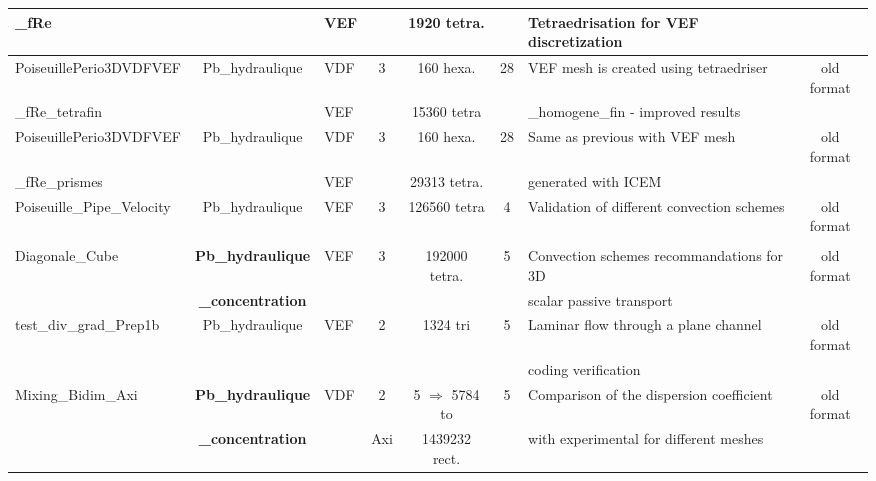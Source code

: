 \begin{table}[H]
\begin{centering}
\begin{tabular}{lclccclc}
\rowcolor{LimeGreen!10}\_fRe & & VEF & & 1920 tetra. & &  Tetraedrisation for VEF discretization & \\ \hline
\rowcolor{LimeGreen!10}PoiseuillePerio3DVDFVEF & Pb\_hydraulique & VDF & 3 & 160 hexa. & 28 & VEF mesh is created using tetraedriser& old format \\ 
\rowcolor{LimeGreen!10}\_fRe\_tetrafin & & VEF & & 15360 tetra & &  \_homogene\_fin - improved results &  \\ \hline
\rowcolor{LimeGreen!10}PoiseuillePerio3DVDFVEF & Pb\_hydraulique & VDF & 3 & 160 hexa. & 28 & Same as previous with VEF mesh & old format \\ 
\rowcolor{LimeGreen!10}\_fRe\_prismes & & VEF & & 29313 tetra. & & generated with ICEM &  \\ \hline
\rowcolor{LimeGreen!10}Poiseuille\_Pipe\_Velocity & Pb\_hydraulique & VEF & 3 & 126560 tetra & 4 & Validation of different convection schemes & old format \\ 
\rowcolor{LimeGreen!10} & & & & & & & \\ \hline
\rowcolor{LimeGreen!10}Diagonale\_Cube & \textbf{Pb\_hydraulique} & VEF & 3 & 192000 tetra. & 5 & Convection schemes recommandations for 3D  & old format \\ 
\rowcolor{LimeGreen!10} & \textbf{\_concentration} & & & & & scalar passive transport & \\ \hline
\rowcolor{LimeGreen!10} test\_div\_grad\_Prep1b & Pb\_hydraulique & VEF & 2 & 1324 tri & 5 & Laminar flow through a plane channel & old format \\
\rowcolor{LimeGreen!10} & & & & & & coding verification & \\ \hline
\rowcolor{LimeGreen!10}Mixing\_Bidim\_Axi & \textbf{Pb\_hydraulique} & VDF & 2 & 5 $\Rightarrow$ 5784 to & 5 & Comparison of the dispersion coefficient & old format \\ 
\rowcolor{LimeGreen!10} & \textbf{\_concentration} & & Axi & 1439232 rect. & & with experimental for different meshes & \\ \hline
	\end{tabular}
\end{centering}
\end{table}

\newpage

